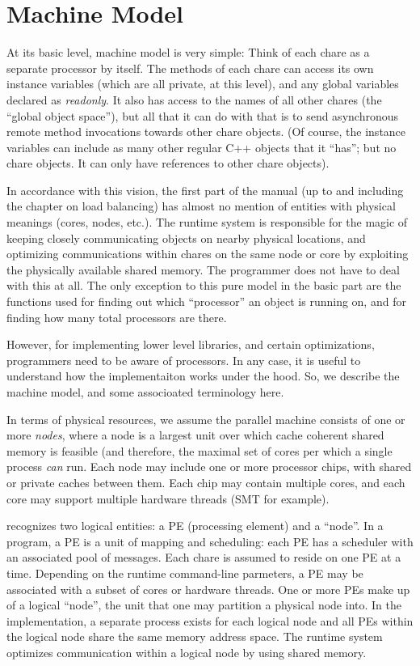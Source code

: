 \section{Machine Model}
\label{machineModel}
At its basic level, \charmpp{} machine model is very simple: Think of
each chare as a separate processor by itself. The methods of each
chare can access its own instance variables (which are all private, at
this level), and any global variables declared as {\em readonly}. It
also has access to the names of all other chares (the ``global object
space''), but all that it can do with that is to send asynchronous
remote method invocations towards other chare objects. (Of course, the
instance variables can include as many other regular C++ objects that
it ``has''; but no chare objects. It can only have references to other
chare objects).

In accordance with this vision, the first part of the manual (up to
and including the chapter on load balancing) has almost no mention of
entities with physical meanings (cores, nodes, etc.). The runtime
system is responsible for the magic of keeping closely communicating
objects on nearby physical locations, and optimizing communications
within chares on the same node or core by exploiting the physically
available shared memory. The programmer does not have to deal with
this at all. The only exception to this pure model in the basic part
are the functions used for finding out which ``processor'' an object
is running on, and for finding how many total processors are there.

However, for implementing lower level libraries, and certain optimizations,
programmers need to be aware of processors. In any case, it is useful
to understand how the \charmpp{} implementaiton works under the hood. So,
we describe the machine model, and some associoated terminology here.

In terms of physical resources, we assume the parallel machine
consists of one or more {\em nodes}, where a node is a largest unit
over which cache coherent shared memory is feasible (and therefore,
the maximal set of cores per which a single process {\em can} run.
Each node may include one or more processor chips, with shared or
private caches between them. Each chip may contain multiple cores, and
each core may support multiple hardware threads (SMT for example).

\charmpp{} recognizes two logical entities: a PE (processing element) and 
a ``node''.   In a \charmpp{} program, a PE is a
unit of mapping and scheduling: each PE has a scheduler with an
associated pool of messages. Each chare is assumed to reside on one PE
at a time. Depending on the runtime command-line parmeters, a PE may
be associated with a subset of cores or hardware threads. One or more PEs
make up of a logical ``node'', the unit that one may partition a physical node
into. In the implementation, a separate
process exists for each logical node and all PEs within the logical node share
the same memory address space. The \charmpp{} runtime system optimizes
communication within a logical node by using shared memory. 

